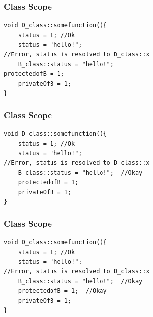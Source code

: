 \documentclass{beamer}
\newtheorem{Key points}{Key points}
\begin{document}
\begin{frame}[fragile]
\frametitle{Class Scope}
\begin{lstlisting}
void D_class::somefunction(){
	status = 1; //Ok
	status = "hello!"; 
//Error, status is resolved to D_class::x
	B_class::status = "hello!"; 
protectedofB = 1; 
	privateOfB = 1; 
}
\end{lstlisting}
\end{frame}

\begin{frame}[fragile]
\frametitle{Class Scope}
\begin{lstlisting}
void D_class::somefunction(){
	status = 1; //Ok
	status = "hello!"; 
//Error, status is resolved to D_class::x
	B_class::status = "hello!";  //Okay
	protectedofB = 1;  
	privateOfB = 1; 
}
\end{lstlisting}
\end{frame}

\begin{frame}[fragile]
\frametitle{Class Scope}
\begin{lstlisting}
void D_class::somefunction(){
	status = 1; //Ok
	status = "hello!"; 
//Error, status is resolved to D_class::x
	B_class::status = "hello!";  //Okay
	protectedofB = 1;  //Okay
	privateOfB = 1; 
}
\end{lstlisting}
\end{frame}
\end{document}
